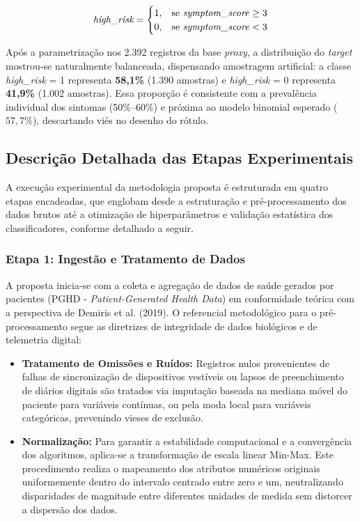 \documentclass[12pt]{article}
\begin{document}
\begin{equation}
\label{eq:target}
\textit{high\_risk} = 
\begin{cases} 
1, & \text{se } \text{\textit{symptom\_score}} \ge 3 \\
0, & \text{se } \text{\textit{symptom\_score}} < 3
\end{cases}
\end{equation}

Após a parametrização nos 2.392 registros da base \textit{proxy}, a distribuição do \textit{target} mostrou-se naturalmente balanceada, dispensando amostragem artificial: a classe \textit{high\_risk} = 1 representa \textbf{58,1\%} (1.390 amostras) e \textit{high\_risk} = 0 representa \textbf{41,9\%} (1.002 amostras). Essa proporção é consistente com a prevalência individual dos sintomas (50\%–60\%) e próxima ao modelo binomial esperado ($57,7\%$), descartando viés no desenho do rótulo.


\subsection{Descrição Detalhada das Etapas Experimentais}
A execução experimental da metodologia proposta é estruturada em quatro etapas encadeadas, que englobam desde a estruturação e pré-processamento dos dados brutos até a otimização de hiperparâmetros e validação estatística dos classificadores, conforme detalhado a seguir.

\subsubsection{Etapa 1: Ingestão e Tratamento de Dados}
A proposta inicia-se com a coleta e agregação de dados de saúde gerados por pacientes (PGHD - \textit{Patient-Generated Health Data}) em conformidade teórica com a perspectiva de Demiris et al. (2019). O referencial metodológico para o pré-processamento segue as diretrizes de integridade de dados biológicos e de telemetria digital:
\begin{itemize}
    \item \textbf{Tratamento de Omissões e Ruídos:} Registros nulos provenientes de falhas de sincronização de dispositivos vestíveis ou lapsos de preenchimento de diários digitais são tratados via imputação baseada na mediana móvel do paciente para variáveis contínuas, ou pela moda local para variáveis categóricas, prevenindo vieses de exclusão.
    \item \textbf{Normalização:} Para garantir a estabilidade computacional e a convergência dos algoritmos, aplica-se a transformação de escala linear Min-Max. Este procedimento realiza o mapeamento dos atributos numéricos originais uniformemente dentro do intervalo centrado entre zero e um, neutralizando disparidades de magnitude entre diferentes unidades de medida sem distorcer a dispersão dos dados.
\end{itemize}
\end{document}
